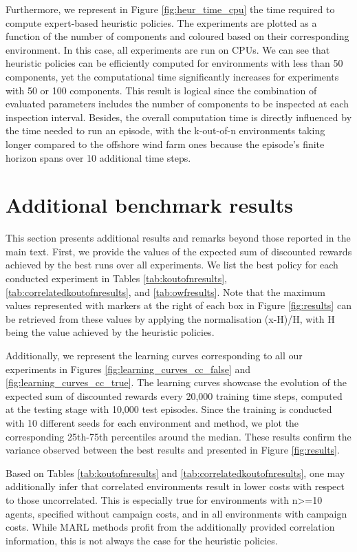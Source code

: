 Furthermore, we represent in Figure \ref{fig:heur_time_cpu} the time required to compute expert-based heuristic policies. The experiments are plotted as a function of the number of components and coloured based on their corresponding environment. In this case, all experiments are run on CPUs. We can see that heuristic policies can be efficiently computed for environments with less than 50 components, yet the computational time significantly increases for experiments with 50 or 100 components. This result is logical since the combination of evaluated parameters includes the number of components to be inspected at each inspection interval. Besides, the overall computation time is directly influenced by the time needed to run an episode, with the k-out-of-n environments taking longer compared to the offshore wind farm ones because the episode's finite horizon spans over 10 additional time steps. 


\section{Additional benchmark results}
\label{sec:ch5_appendix_add_results}
This section presents additional results and remarks beyond those reported in the main text.
First, we provide the values of the expected sum of discounted rewards achieved by the best runs over all experiments.
We list the best policy for each conducted experiment in Tables \ref{tab:koutofnresults}, \ref{tab:correlatedkoutofnresults}, and \ref{tab:owfresults}.
Note that the maximum values represented with markers at the right of each box in Figure \ref{fig:results} can be retrieved from these values by applying the normalisation (x-H)/H, with H being the value achieved by the heuristic policies.

Additionally, we represent the learning curves corresponding to all our experiments in Figures \ref{fig:learning_curves_cc_false} and \ref{fig:learning_curves_cc_true}.
The learning curves showcase the evolution of the expected sum of discounted rewards every 20,000 training time steps, computed at the testing stage with 10,000 test episodes.
Since the training is conducted with 10 different seeds for each environment and method, we plot the corresponding 25th-75th percentiles around the median.
These results confirm the variance observed between the best results and presented in Figure \ref{fig:results}.

Based on Tables \ref{tab:koutofnresults} and \ref{tab:correlatedkoutofnresults}, one may additionally infer that correlated environments result in lower costs with respect to those uncorrelated.
This is especially true for environments with n>=10 agents, specified without campaign costs, and in all environments with campaign costs.
While MARL methods profit from the additionally provided correlation information, this is not always the case for the heuristic policies.

